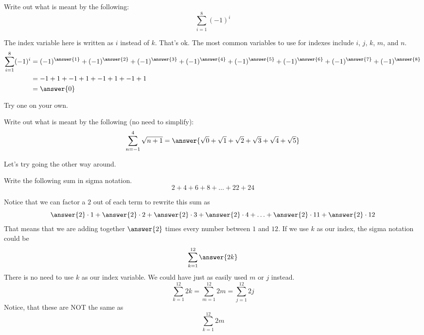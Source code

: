 \documentclass{ximera}
\begin{document}
\begin{example}
	Write out what is meant by the following:
	\[ \sum_{i=1}^{8} \left(-1\right)^i \]
	\begin{explanation}
		The index variable here is written as $i$ instead of $k$.  That's ok.  The most common variables to use for indexes include $i$, $j$, $k$, $m$, and $n$.
		\begin{align*}
			\sum_{i=1}^8 (-1)^i &= (-1)^{\answer{1}} + (-1)^{\answer{2}} + (-1)^{\answer{3}} + (-1)^{\answer{4}} + (-1)^{\answer{5} }+ (-1)^{\answer{6}} + (-1)^{\answer{7}} + (-1)^{\answer{8}} \\
				&= -1 + 1 + -1 + 1 + -1 + 1 + -1 + 1\\
				&= \answer{0}
		\end{align*}	
	\end{explanation}
\end{example}
 

Try one on your own.
\begin{question}
	Write out what is meant by the following (no need to simplify):
	\[ \sum_{n=-1}^{4} \sqrt{n+1} =\answer{\sqrt{0}+\sqrt{1}+\sqrt{2}+\sqrt{3}+\sqrt{4}+\sqrt{5}}\]
\end{question}
 

Let's try going the other way around.
\begin{example}
	Write the following sum in sigma notation.
	\[ 2 + 4 + 6 + 8 + \ldots + 22 + 24 \]
	\begin{explanation}
		Notice that we can factor a $2$ out of each term to rewrite this sum as
		\[ \answer{2}\cdot 1 + \answer{2} \cdot 2 + \answer{2}\cdot 3 + \answer{2} \cdot 4 + \ldots + \answer{2}\cdot 11 + \answer{2}\cdot 12 \]
		That means that we are adding together $\answer{2}$ times every number between $1$ and $12$.  If we use $k$ as our index, the sigma notation could be
		\[ \sum_{k=1}^{12} \answer{2k} \]
		There is no need to use $k$ as our index variable.  We could have just as easily used $m$ or $j$ instead.
		\[ \sum_{k=1}^{12} 2k = \sum_{m=1}^{12} 2m = \sum_{j=1}^{12} 2j\]  
		Notice, that these are NOT the same as
		\[ \sum_{k=1}^{12} 2m \]
	\end{explanation}
\end{example}
 
\end{document}
